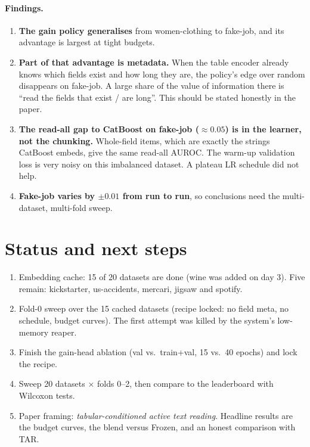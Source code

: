 \documentclass[11pt,a4paper]{article}
\begin{document}
\paragraph{Findings.}
\begin{enumerate}[nosep]
  \item \textbf{The gain policy generalises} from women-clothing to fake-job, and its advantage is largest at tight budgets.
  \item \textbf{Part of that advantage is metadata.}
        When the table encoder already knows which fields exist and how long they are, the policy's edge over random disappears on fake-job.
        A large share of the value of information there is ``read the fields that exist / are long''.
        This should be stated honestly in the paper.
  \item \textbf{The read-all gap to CatBoost on fake-job ($\approx0.05$) is in the learner, not the chunking.}
        Whole-field items, which are exactly the strings CatBoost embeds, give the same read-all AUROC.
        The warm-up validation loss is very noisy on this imbalanced dataset.
        A plateau LR schedule did not help.
  \item \textbf{Fake-job varies by $\pm0.01$ from run to run}, so conclusions need the multi-dataset, multi-fold sweep.
\end{enumerate}

\section{Status and next steps}
\begin{enumerate}[nosep]
  \item Embedding cache: 15 of 20 datasets are done (wine was added on day 3).
        Five remain: kickstarter, us-accidents, mercari, jigsaw and spotify.
  \item Fold-0 sweep over the 15 cached datasets (recipe locked: no field meta, no schedule, budget curves).
        The first attempt was killed by the system's low-memory reaper.
  \item Finish the gain-head ablation (val vs.\ train+val, 15 vs.\ 40 epochs) and lock the recipe.
  \item Sweep 20 datasets $\times$ folds 0--2, then compare to the leaderboard with Wilcoxon tests.
  \item Paper framing: \emph{tabular-conditioned active text reading}.
        Headline results are the budget curves, the blend versus Frozen, and an honest comparison with TAR.
\end{enumerate}
\end{document}
